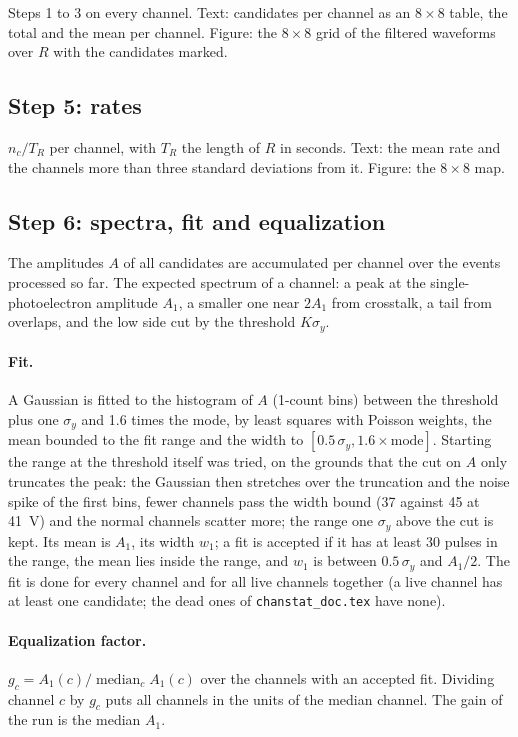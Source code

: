 \documentclass[11pt]{article}
\newcommand{\code}[1]{\texttt{#1}}
\begin{document}
Steps 1 to 3 on every channel. Text: candidates per channel as an
$8\times8$ table, the total and the mean per channel. Figure: the
$8\times8$ grid of the filtered waveforms over $R$ with the candidates
marked.

\subsection{Step 5: rates}

$n_c / T_R$ per channel, with $T_R$ the length of $R$ in seconds. Text:
the mean rate and the channels more than three standard deviations from
it. Figure: the $8\times8$ map.

\subsection{Step 6: spectra, fit and equalization}

The amplitudes $A$ of all candidates are accumulated per channel over
the events processed so far. The expected spectrum of a channel: a peak
at the single-photoelectron amplitude $A_1$, a smaller one near $2 A_1$
from crosstalk, a tail from overlaps, and the low side cut by the
threshold $K \sigma_y$.

\paragraph{Fit.} A Gaussian is fitted to the histogram of $A$ (1-count
bins) between the threshold plus one $\sigma_y$ and 1.6 times the mode,
by least squares with Poisson weights, the mean bounded to the fit range
and the width to $[0.5\,\sigma_y, 1.6 \times \mathrm{mode}]$. Starting
the range at the threshold itself was tried, on the grounds that the cut
on $A$ only truncates the peak: the Gaussian then stretches over the
truncation and the noise spike of the first bins, fewer channels pass
the width bound (37 against 45 at 41~V) and the normal channels scatter
more; the range one $\sigma_y$ above the cut is kept. Its mean is $A_1$, its width
$w_1$; a fit is accepted if it has at least 30 pulses in the range, the
mean lies inside the range, and $w_1$ is between $0.5\,\sigma_y$ and
$A_1 / 2$. The fit is done for every channel and for all live channels
together (a live channel has at least one candidate; the dead ones of
\code{chanstat\_doc.tex} have none).

\paragraph{Equalization factor.} $g_c = A_1(c) / \operatorname{median}_c
A_1(c)$ over the channels with an accepted fit. Dividing channel $c$ by
$g_c$ puts all channels in the units of the median channel. The gain of
the run is the median $A_1$.
\end{document}
